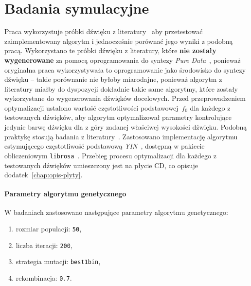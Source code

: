 \chapter{Badania symulacyjne}\label{chap:research}



Praca wykorzystuje próbki dźwięku z literatury~\cite{evolutionary_puredata_results}
aby przetestować zaimplementowany algorytm i jednocześnie porównać jego wyniki
z podobną pracą. Wykorzystano te próbki dźwięku
z literatury, które \textbf{nie zostały wygenerowane} za pomocą
oprogramowania do syntezy \textit{Pure Data}~\cite{pure_data},
ponieważ oryginalna praca wykorzystywała
to oprogramowanie jako środowisko do syntezy dźwięku -- takie porównanie
nie byłoby miarodajne, ponieważ algorytm z literatury miałby do dyspozycji
dokładnie takie same algorytmy, które zostały wykorzystane do wygenerowania
dźwięków docelowych.
Przed przeprowadzeniem optymalizacji ustalono wartość częstotliwości podstawowej~$f_0$
dla każdego z testowanych dźwięków, aby algorytm optymalizował parametry kontrolujące
jedynie barwę dźwięku dla z góry zadanej właściwej wysokości dźwięku.
Podobną praktykę stosują badania z literatury~\cite{ieee_synth_programming}.
Zastosowano implementację algorytmu estymującego częstotliwość podstawową
\textit{YIN}~\cite{yin_pitch_estimation}, dostępną w pakiecie obliczeniowym
\texttt{librosa}~\cite{librosa}. Przebieg procesu optymalizacji dla każdego z testowanych
dźwięków umieszczony jest na płycie CD, co opisuje dodatek~\ref{chap:opis-plyty}.

\subsubsection{Parametry algorytmu genetycznego}

W badaniach zastosowano następujące parametry algorytmu genetycznego:

\begin{enumerate}
  \item rozmiar populacji: \texttt{50},
  \item liczba iteracji: \texttt{200},
  \item strategia mutacji: \texttt{best1bin},
  \item rekombinacja: \texttt{0.7}.
\end{enumerate}


